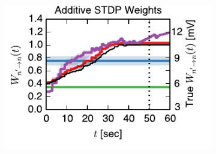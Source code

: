 \begin{figure}[t!]

  \begin{subfigure}[T]{2.4in}
    \flushleft
    \includegraphics[width=\textwidth]{figures/ch6/fig4_add_thr_trajectory_mv}    

\end{subfigure}
\end{figure}
